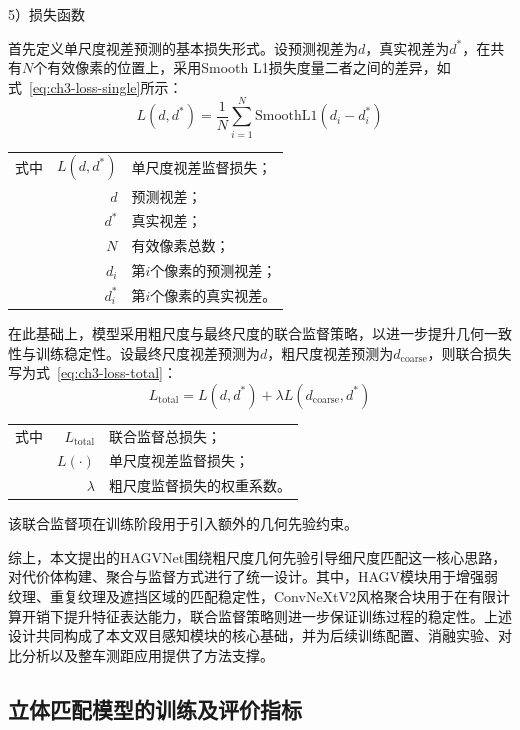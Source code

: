 5）损失函数

首先定义单尺度视差预测的基本损失形式。设预测视差为$d$，真实视差为$d^*$，在共有$N$个有效像素的位置上，采用Smooth L1损失度量二者之间的差异，如式~\eqref{eq:ch3-loss-single}所示：
\begin{equation}\label{eq:ch3-loss-single}
L(d,d^*)=\frac{1}{N}\sum_{i=1}^{N}\mathrm{SmoothL1}(d_i-d_i^*)
\end{equation}
\begin{tabularx}{\textwidth}{@{}l@{\quad}r@{———}X@{}}
式中& $L(d,d^*)$ & 单尺度视差监督损失；\\
& $d$ & 预测视差；\\
& $d^*$ & 真实视差；\\
& $N$ & 有效像素总数；\\
& $d_i$ & 第$i$个像素的预测视差；\\
& $d_i^*$ & 第$i$个像素的真实视差。\\
\end{tabularx}\vspace{3.15bp}

在此基础上，模型采用粗尺度与最终尺度的联合监督策略，以进一步提升几何一致性与训练稳定性。设最终尺度视差预测为$d$，粗尺度视差预测为$d_{\text{coarse}}$，则联合损失写为式~\eqref{eq:ch3-loss-total}：
\begin{equation}\label{eq:ch3-loss-total}
L_{\text{total}}=L(d,d^*)+\lambda L(d_{\text{coarse}},d^*)
\end{equation}
\begin{tabularx}{\textwidth}{@{}l@{\quad}r@{———}X@{}}
式中& $L_{\text{total}}$ & 联合监督总损失；\\
& $L(\cdot)$ & 单尺度视差监督损失；\\
& $\lambda$ & 粗尺度监督损失的权重系数。\\
\end{tabularx}\vspace{3.15bp}

该联合监督项在训练阶段用于引入额外的几何先验约束。

综上，本文提出的HAGVNet围绕粗尺度几何先验引导细尺度匹配这一核心思路，对代价体构建、聚合与监督方式进行了统一设计。其中，HAGV模块用于增强弱纹理、重复纹理及遮挡区域的匹配稳定性，ConvNeXtV2风格聚合块用于在有限计算开销下提升特征表达能力，联合监督策略则进一步保证训练过程的稳定性。上述设计共同构成了本文双目感知模块的核心基础，并为后续训练配置、消融实验、对比分析以及整车测距应用提供了方法支撑。

\subsection{立体匹配模型的训练及评价指标}
\label{sec:ch3-stereo-training-metrics}

